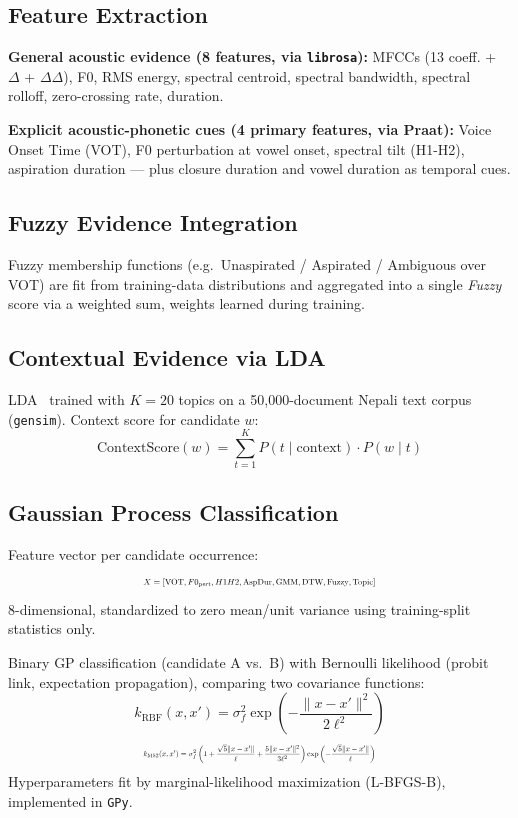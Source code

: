 \documentclass[10pt,conference]{IEEEtran}
\begin{document}
\subsection{Feature Extraction}
\textbf{General acoustic evidence (8 features, via \texttt{librosa}):}
MFCCs (13 coeff. + $\Delta$ + $\Delta\Delta$), F0, RMS energy, spectral
centroid, spectral bandwidth, spectral rolloff, zero-crossing rate,
duration.

\textbf{Explicit acoustic-phonetic cues (4 primary features, via
Praat):} Voice Onset Time (VOT), F0 perturbation at vowel onset, spectral
tilt (H1-H2), aspiration duration --- plus closure duration and vowel
duration as temporal cues.

\subsection{Fuzzy Evidence Integration}
Fuzzy membership functions (e.g.\ Unaspirated / Aspirated / Ambiguous
over VOT) are fit from training-data distributions and aggregated into a
single \emph{Fuzzy} score via a weighted sum, weights learned during
training.

\subsection{Contextual Evidence via LDA}
LDA~\cite{blei2003lda} trained with $K=20$ topics on a 50{,}000-document
Nepali text corpus (\texttt{gensim}). Context score for candidate $w$:
\begin{equation}
\text{ContextScore}(w) = \sum_{t=1}^{K} P(t \mid \text{context}) \cdot P(w \mid t)
\end{equation}

\subsection{Gaussian Process Classification}
Feature vector per candidate occurrence:
\begin{equation}
\resizebox{0.48\textwidth}{!}{$\displaystyle
X = [\text{VOT}, F0_{\text{pert}}, H1H2, \text{AspDur}, \text{GMM}, \text{DTW}, \text{Fuzzy}, \text{Topic}]
$}
\end{equation}
8-dimensional, standardized to zero mean/unit variance using
training-split statistics only.

Binary GP classification (candidate A vs.\ B) with Bernoulli likelihood
(probit link, expectation propagation), comparing two covariance
functions:
\begin{equation}
k_{\text{RBF}}(x,x') = \sigma_f^2 \exp\left(-\frac{\|x-x'\|^2}{2\ell^2}\right)
\end{equation}
\begin{equation}
\resizebox{0.48\textwidth}{!}{$\displaystyle
k_{\text{M52}}(x,x') = \sigma_f^2\left(1+\frac{\sqrt{5}\|x-x'\|}{\ell}+\frac{5\|x-x'\|^2}{3\ell^2}\right)\exp\left(-\frac{\sqrt{5}\|x-x'\|}{\ell}\right)
$}
\end{equation}
Hyperparameters fit by marginal-likelihood maximization (L-BFGS-B),
implemented in \texttt{GPy}.
\end{document}
